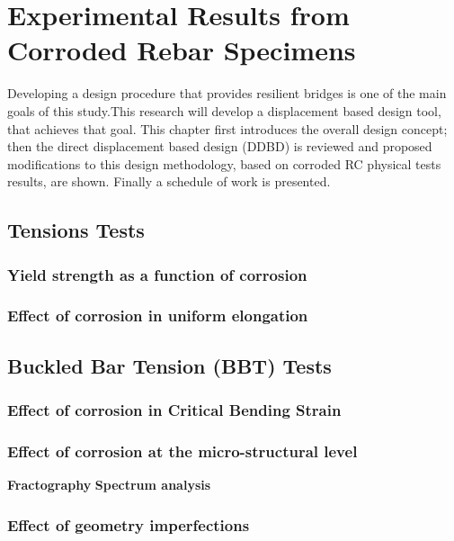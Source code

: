 \chapter{Experimental Results from Corroded Rebar Specimens}
Developing a design procedure that provides resilient bridges is one of the main goals of this study.This research will develop a displacement based design tool, that achieves that goal. This chapter first introduces the overall design concept; then the direct displacement based design (DDBD) is reviewed and proposed modifications to this design methodology, based on corroded RC physical tests results, are shown. Finally a schedule of work is presented.

\section{Tensions Tests}
\subsection{Yield strength as a function of corrosion}
\subsection{Effect of corrosion in uniform elongation}
\section{Buckled Bar Tension (BBT) Tests}
\subsection{Effect of corrosion in Critical Bending Strain}
\subsection{Effect of corrosion at the micro-structural level}
\textbf{Fractography}
\textbf{Spectrum analysis}
\subsection{Effect of geometry imperfections}